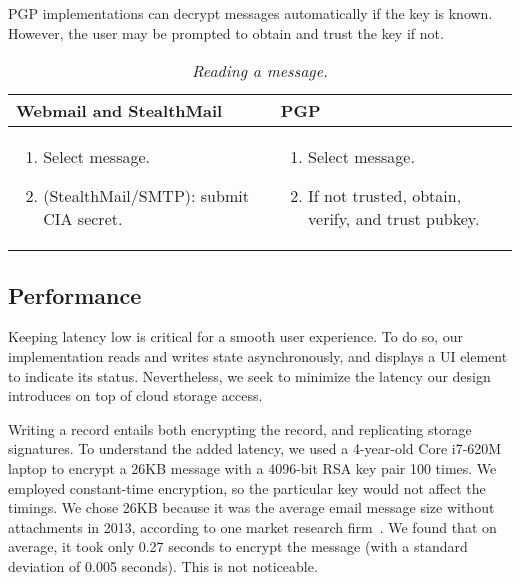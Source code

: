 PGP implementations can decrypt messages automatically if the key is known.  However, the user may be prompted to obtain and trust the key if not.

\begin{table}[ht!]
\begin{tabular}{ | L{3.5cm} | L{3.5cm} |}
\hline
\textbf{Webmail and StealthMail} & \textbf{PGP} \\
\hline
\vspace{-3mm}
\begin{enumerate}
  \item{Select message.}
  \item{(StealthMail/SMTP): submit CIA secret.}
\end{enumerate}
\vspace{-3mm}
 &

\vspace{-3mm}
\begin{enumerate}
  \item{Select message.}
  \item{If not trusted, obtain, verify, and trust pubkey.}
\end{enumerate} 
\vspace{-\topsep} \\

\hline
\end{tabular}
\caption{\it Reading a message.}
\label{tab:account-creation}
\end{table}

\subsection{Performance}

Keeping latency low is critical for a smooth user experience.  To do so, our implementation reads and writes state asynchronously, and displays a UI element to indicate its status.  Nevertheless, we seek to minimize the latency our design introduces on top of cloud storage access.

Writing a record entails both encrypting the record, and replicating storage signatures.  To understand the added latency, we used a 4-year-old Core i7-620M laptop to encrypt a 26KB message with a 4096-bit RSA key pair 100 times.  We employed constant-time encryption, so the particular key would not affect the timings.  We chose 26KB because it was the average email message size without attachments in 2013, according to one market research firm~\cite{email-statistics-report}.  We found that on average, it took only 0.27 seconds to encrypt the message (with a standard deviation of 0.005 seconds).  This is not noticeable.

